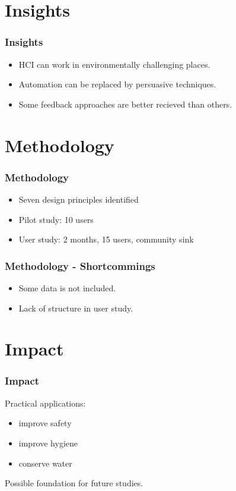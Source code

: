 \documentclass{beamer}
\begin{document}
\section{Insights}
\begin{frame}
	\frametitle{Insights}
	\begin{itemize}
	  \item HCI can work in environmentally challenging places.
          \item Automation can be replaced by persuasive techniques.
          \item Some feedback approaches are better recieved than others.
        \end{itemize}          

\end{frame}
\section{Methodology}
\begin{frame}
	\frametitle{Methodology}
	\begin{itemize}
	  \item Seven design principles identified
	  \item Pilot study: 10 users
          \item User study: 2 months, 15 users, community sink
        \end{itemize}          

\end{frame}

\begin{frame}
	\frametitle{Methodology - Shortcommings}
	\begin{itemize}
	  \item Some data is not included.
	  \item Lack of structure in user study.
        \end{itemize}          


\end{frame}


\section{Impact}
\begin{frame}
	\frametitle{Impact}
        Practical applications:
	\begin{itemize}
	  \item improve safety
          \item improve hygiene
          \item conserve water
        \end{itemize} 
        Possible foundation for future studies.
\end{frame}
\end{document}
